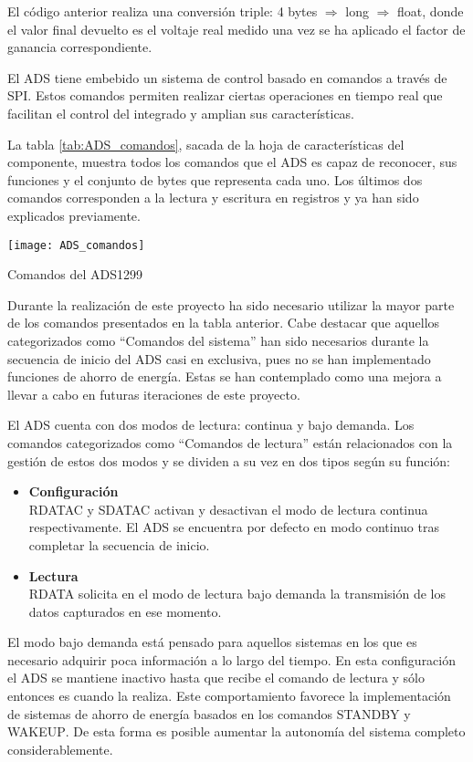 El código anterior realiza una conversión triple: 4 bytes $\Rightarrow$ long $\Rightarrow$ float, donde el valor final devuelto es el voltaje real medido una vez se ha aplicado el factor de ganancia correspondiente.

El ADS tiene embebido un sistema de control basado en comandos a través de SPI. Estos comandos permiten realizar ciertas operaciones en tiempo real que facilitan el control del integrado y amplian sus características. 

La tabla \ref{tab:ADS_comandos}, sacada de la hoja de características del componente, muestra todos los comandos que el ADS es capaz de reconocer, sus funciones y el conjunto de bytes que representa cada uno. Los últimos dos comandos corresponden a la lectura y escritura en registros y ya han sido explicados previamente.

\begin{table}[H]
    \centering
    \texttt{[image: ADS\_comandos]}
    \caption{Comandos del ADS1299}
    \label{tab:ADS_comandos}
\end{table}

Durante la realización de este proyecto ha sido necesario utilizar la mayor parte de los comandos presentados en la tabla anterior. Cabe destacar que aquellos categorizados como ``Comandos del sistema'' han sido necesarios durante la secuencia de inicio del ADS casi en exclusiva, pues no se han implementado funciones de ahorro de energía. Estas se han contemplado como una mejora a llevar a cabo en futuras iteraciones de este proyecto.

El ADS cuenta con dos modos de lectura: continua y bajo demanda. Los comandos categorizados como ``Comandos de lectura'' están relacionados con la gestión de estos dos modos y se dividen a su vez en dos tipos según su función:
\begin{itemize}
\item \textbf{Configuración}\\
\textsc{RDATAC} y \textsc{SDATAC} activan y desactivan el modo de lectura continua respectivamente. El ADS se encuentra por defecto en modo continuo tras completar la secuencia de inicio.
\item \textbf{Lectura}\\
\textsc{RDATA} solicita en el modo de lectura bajo demanda la transmisión de los datos capturados en ese momento.
\end{itemize} 

El modo bajo demanda está pensado para aquellos sistemas en los que es necesario adquirir poca información a lo largo del tiempo. En esta configuración el ADS se mantiene inactivo hasta que recibe el comando de lectura y sólo entonces es cuando la realiza. Este comportamiento favorece la implementación de sistemas de ahorro de energía basados en los comandos \textsc{STANDBY} y \textsc{WAKEUP}. De esta forma es posible aumentar la autonomía del sistema completo considerablemente.

